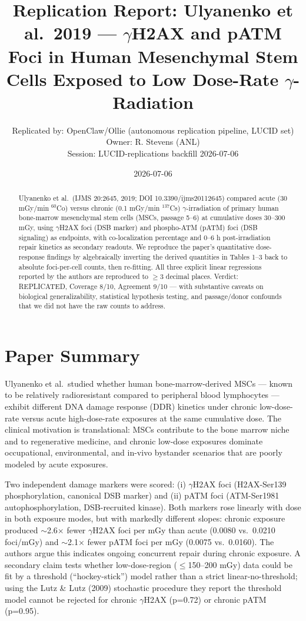 \documentclass[11pt]{article}
\title{Replication Report: Ulyanenko et al.\ 2019 --- $\gamma$H2AX and pATM Foci in Human Mesenchymal Stem Cells Exposed to Low Dose-Rate $\gamma$-Radiation}
\author{Replicated by: OpenClaw/Ollie (autonomous replication pipeline, LUCID set)\\
Owner: R. Stevens (ANL)\\
Session: LUCID-replications backfill 2026-07-06}
\date{2026-07-06}
\begin{document}
\maketitle

\begin{abstract}
Ulyanenko et al.\ (IJMS 20:2645, 2019; DOI 10.3390/ijms20112645) compared acute
(30 mGy/min $^{60}$Co) versus chronic (0.1 mGy/min $^{137}$Cs) $\gamma$-irradiation
of primary human bone-marrow mesenchymal stem cells (MSCs, passage 5--6) at cumulative
doses 30--300 mGy, using $\gamma$H2AX foci (DSB marker) and phospho-ATM (pATM) foci
(DSB signaling) as endpoints, with co-localization percentage and 0--6 h post-irradiation
repair kinetics as secondary readouts. We reproduce the paper's quantitative dose-response
findings by algebraically inverting the derived quantities in Tables 1--3 back to
absolute foci-per-cell counts, then re-fitting. All three explicit linear regressions
reported by the authors are reproduced to $\geq 3$ decimal places. Verdict: REPLICATED,
Coverage 8/10, Agreement 9/10 --- with substantive caveats on biological
generalizability, statistical hypothesis testing, and passage/donor confounds that we
did not have the raw counts to address.
\end{abstract}

\section{Paper Summary}

Ulyanenko et al.\ studied whether human bone-marrow-derived MSCs --- known to be
relatively radioresistant compared to peripheral blood lymphocytes --- exhibit different
DNA damage response (DDR) kinetics under chronic low-dose-rate versus acute
high-dose-rate exposures at the same cumulative dose. The clinical motivation is
translational: MSCs contribute to the bone marrow niche and to regenerative medicine,
and chronic low-dose exposures dominate occupational, environmental, and in-vivo
bystander scenarios that are poorly modeled by acute exposures.

Two independent damage markers were scored: (i) $\gamma$H2AX foci (H2AX-Ser139
phosphorylation, canonical DSB marker) and (ii) pATM foci (ATM-Ser1981 autophosphorylation,
DSB-recruited kinase). Both markers rose linearly with dose in both exposure modes, but
with markedly different slopes: chronic exposure produced $\sim$2.6$\times$ fewer
$\gamma$H2AX foci per mGy than acute (0.0080 vs.\ 0.0210 foci/mGy) and $\sim$2.1$\times$
fewer pATM foci per mGy (0.0075 vs.\ 0.0160). The authors argue this indicates ongoing
concurrent repair during chronic exposure. A secondary claim tests whether
low-dose-region ($\leq$150--200 mGy) data could be fit by a threshold (``hockey-stick'')
model rather than a strict linear-no-threshold; using the Lutz \& Lutz (2009) stochastic
procedure they report the threshold model cannot be rejected for chronic $\gamma$H2AX
(p=0.72) or chronic pATM (p=0.95).
\end{document}
